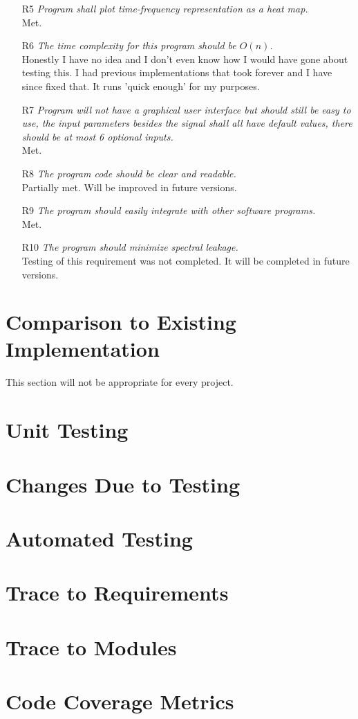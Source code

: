\documentclass[12pt, titlepage]{article}
\begin{document}
\begin{itemize}
\item[R5]\emph{ Program shall plot time-frequency representation as a heat map.}\\
Met.
\item[R6] \emph{The time complexity for this program should be $O(n)$.}\\
Honestly I have no idea and I don't even know how I would have gone about testing this. I had previous implementations that took forever and I have since fixed that. It runs 'quick enough' for my purposes. 

\item[R7] \emph{Program will not have a graphical user interface but should still be easy to use, the input parameters besides the signal shall all have default values, there should be at most 6 optional inputs.}\\
Met.


\item[R8] \emph{The program code should be clear and readable.}\\
Partially met. Will be improved in future versions.
\item[R9] \emph{The program should easily integrate with other software programs.}\\
Met. 
\item[R10] \emph{The program should minimize spectral leakage.}\\
Testing of this requirement was not completed. It will be completed in future versions.

\end{itemize}
	
\section{Comparison to Existing Implementation}	

This section will not be appropriate for every project.

\section{Unit Testing}

\section{Changes Due to Testing}

\section{Automated Testing}
		
\section{Trace to Requirements}
		
\section{Trace to Modules}		

\section{Code Coverage Metrics}




\end{document}
